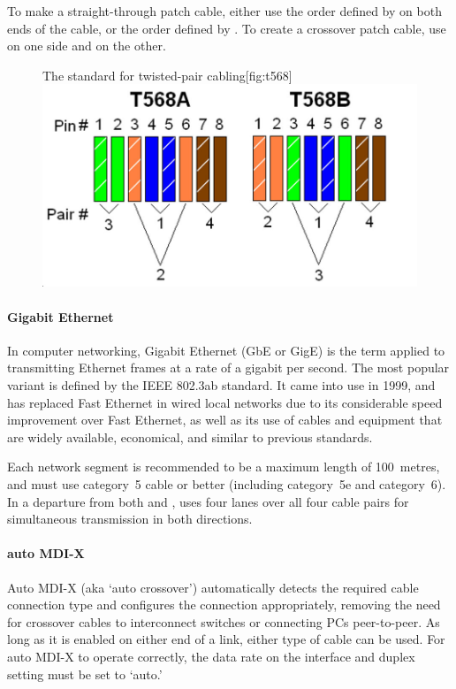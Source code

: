 To make a straight-through patch cable, either use the order defined by  on both ends of the cable, or the order defined by .
To create a crossover patch cable, use  on one side and  on the other.

\begin{figure}
\begin{sidecaption}{The  standard for twisted-pair cabling}[fig:t568]
\centering
\includegraphics[width=.7\textwidth]{images/physical/t568.jpeg}
\end{sidecaption}
\end{figure}


\paragraph{Gigabit Ethernet}
In computer networking, Gigabit Ethernet (GbE or GigE) is the term applied to transmitting Ethernet frames at a rate of a gigabit per second.
The most popular variant  is defined by the \acs{IEEE} 802.3ab standard.
It came into use in 1999, and has replaced Fast Ethernet in wired local networks due to its considerable speed improvement over Fast Ethernet, as well as its use of cables and equipment that are widely available, economical, and similar to previous standards.

Each  network segment is recommended to be a maximum length of 100~metres, and must use category~5 cable or better (including category~5e and category~6).
In a departure from both  and ,  uses four lanes over all four cable pairs for simultaneous transmission in both directions.

\paragraph{auto \acs{MDI-X}}
Auto \acs{MDI-X} (aka `auto crossover') automatically detects the required cable connection type and configures the connection appropriately, removing the need for crossover cables to interconnect switches or connecting \acsp{PC} peer-to-peer.
As long as it is enabled on either end of a link, either type of cable can be used.
For auto \acs{MDI-X} to operate correctly, the data rate on the interface and duplex setting must be set to `auto.'

